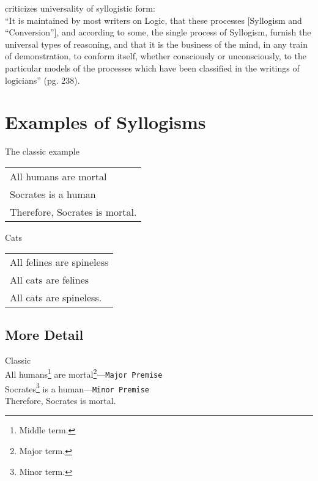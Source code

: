 \documentclass{article}
\begin{document}
\begin{remark} \cite{boole1854laws} criticizes universality of syllogistic form:\\
``It is maintained by most writers on Logic, that these processes [Syllogism and ``Conversion''], and according to some, the single process of Syllogism, furnish the universal types of reasoning, and that it is the business of the mind, in any train of demonstration, to conform itself, whether consciously or unconsciously, to the particular models of the processes which have been classified in the writings of logicians'' (pg. 238).
\end{remark}

\newpage
\section{Examples of Syllogisms}

\begin{syllogism} The classic example\\\label{syll:socrates}
\begin{tabular}{|p{6cm}|}
\hline
\hline
All humans are mortal\\
Socrates is a human\\
Therefore, Socrates is mortal.\\
\hline
\hline
\end{tabular}
\end{syllogism}


\begin{syllogism} Cats\\\label{syll:cats}
\begin{tabular}{|p{6cm}|}
\hline
\hline
All felines are spineless\\
All cats are felines\\
All cats are spineless.\\ 
\hline
\hline
\end{tabular}
\end{syllogism}

\subsection{More Detail}

\begin{syllogism}Classic\\
All humans\footnote{Middle term.} are mortal\footnote{Major term.}---\texttt{Major Premise}\\
Socrates\footnote{Minor term.} is a human---\texttt{Minor Premise}\\
Therefore, Socrates is mortal.
\end{syllogism}
\end{document}
